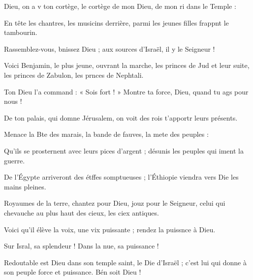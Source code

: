 \item Dieu, on a v ton cortège,\psstar{} le cortège de mon Dieu, de mon ri dans le Temple :
\item En tête les chantres, les musicins derrière,\psstar{} parmi les jeunes filles frappnt le tambourin.
\item Rassemblez-vous, bnissez Dieu ;\psstar{} aux sources d’Israël, il y  le Seigneur !
\item Voici Benjamin, le plus jeune, ouvrant la marche,\pscross{} les princes de Jud et leur suite,\psstar{} les princes de Zabulon, les prnces de Nephtali.
\item Ton Dieu l’a command : « Sois fort ! »\psstar{} Montre ta force, Dieu, quand tu ags pour nous !
\item De ton palais, qui domne Jérusalem,\psstar{} on voit des rois t’apportr leurs présents.
\item Menace la Bte des marais,\psstar{} la bande de fauves, la mete des peuples : 
\item Qu’ils se prosternent avec leurs pices d’argent ;\psstar{} désunis les peuples qui iment la guerre.
\item De l’Égypte arriveront des étffes somptueuses ;\psstar{} l’Éthiopie viendra vers Die les mains pleines.
\item Royaumes de la terre, chantez pour Dieu, jouz pour le Seigneur,\psstar{} celui qui chevauche au plus haut des cieux, les ciex antiques. 
\item Voici qu’il élève la voix, une vix puissante ;\psstar{} rendez la puissnce à Dieu.
\item Sur Isral, sa splendeur !\psstar{} Dans la nue, sa puissance !
\item Redoutable est Dieu dans son temple saint, le Die d’Israël ;\psstar{} c’est lui qui donne à son peuple force et puissance. Bén soit Dieu !